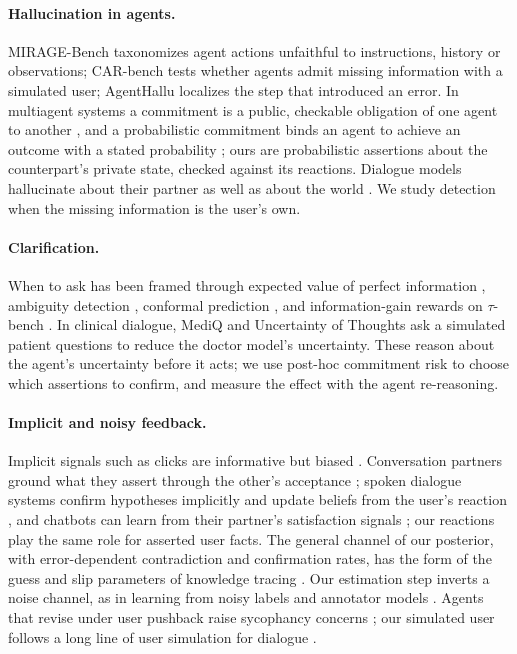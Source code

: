 \documentclass[10pt,a4paper,twocolumn]{article}
\begin{document}
\paragraph{Hallucination in agents.} MIRAGE-Bench \citep{zhang2025mirage}
taxonomizes agent actions unfaithful to instructions, history or
observations; CAR-bench \citep{kirmayr2026carbench} tests whether agents
admit missing information with a simulated user; AgentHallu
\citep{liu2026agenthallu} localizes the step that introduced an error.
In multiagent systems a commitment is a public, checkable obligation of one
agent to another \citep{singh1999ontology}, and a probabilistic commitment
binds an agent to achieve an outcome with a stated probability
\citep{zhang2016commitment}; ours are probabilistic assertions about the
counterpart's private state, checked against its reactions. Dialogue models
hallucinate about their partner as well as about the world
\citep{dziri2022origin}. We study detection when the
missing information is the user's own.

\paragraph{Clarification.} When to ask has been framed through expected
value of perfect information \citep{rao2018learning,suri2025sage}, ambiguity
detection \citep{zhang2025clarify}, conformal prediction \citep{ren2023knowno},
and information-gain rewards on $\tau$-bench
\citep{deng2026clarification,yao2024taubench}. In clinical dialogue, MediQ
\citep{li2024mediq} and Uncertainty of Thoughts \citep{hu2024uot} ask a
simulated patient questions to reduce the doctor model's uncertainty. These
reason about the agent's uncertainty before it acts; we use post-hoc
commitment risk to choose which assertions to confirm, and measure the
effect with the agent re-reasoning.

\paragraph{Implicit and noisy feedback.} Implicit signals such as clicks are
informative but biased \citep{joachims2005clickthrough}. Conversation partners ground what they assert through
the other's acceptance \citep{clark1991grounding}; spoken dialogue
systems confirm hypotheses implicitly and update beliefs from the user's
reaction \citep{bohus2005constructing,williams2007pomdp}, and chatbots can
learn from their partner's satisfaction signals \citep{hancock2019learning}; our reactions play
the same role for asserted user facts. The general channel of our posterior,
with error-dependent contradiction and confirmation rates, has the form of
the guess and slip parameters of knowledge tracing
\citep{corbett1994knowledge}. Our estimation step
inverts a noise channel, as in learning from noisy labels
\citep{angluin1988noisy,natarajan2013learning,scott2013asymmetric} and
annotator models \citep{dawid1979maximum}. Agents that revise under user
pushback raise sycophancy concerns \citep{sharma2024sycophancy}; our
simulated user follows a long line of user simulation for dialogue
\citep{schatzmann2006survey}.
\end{document}
